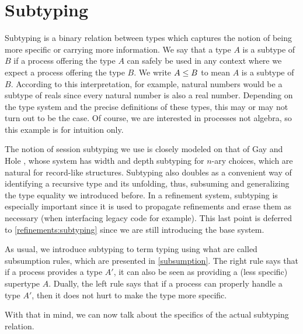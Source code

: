 
\chapter{Subtyping}
\label{base:subtyping}

Subtyping is a binary relation between types which captures the notion of being more specific or carrying more information. We say that a type $A$ is a subtype of $B$ if a process offering the type $A$ can safely be used in any context where we expect a process offering the type $B$. We write $A \le B$ to mean $A$ is a subtype of $B$. According to this interpretation, for example, natural numbers would be a subtype of reals since every natural number is also a real number. Depending on the type system and the precise definitions of these types, this may or may not turn out to be the case. Of course, we are interested in processes not algebra, so this example is for intuition only.

The notion of session subtyping we use is closely modeled on that of Gay and Hole \cite{GayH05}, whose system has width and depth subtyping for $n$-ary choices, which are natural for record-like structures. Subtyping also doubles as a convenient way of identifying a recursive type and its unfolding, thus, subsuming and generalizing the type equality we introduced before. In a refinement system, subtyping is especially important since it is used to propagate refinements and erase them as necessary (when interfacing legacy code for example). This last point is deferred to \cref{refinements:subtyping} since we are still introducing the base system.

As usual, we introduce subtyping to term typing using what are called subsumption rules, which are presented in \cref{subsumption}. The right rule says that if a process provides a type $A'$, it can also be seen as providing a (less specific) supertype $A$. Dually, the left rule says that if a process can properly handle a type $A'$, then it does not hurt to make the type more specific.


With that in mind, we can now talk about the specifics of the actual subtyping relation.

